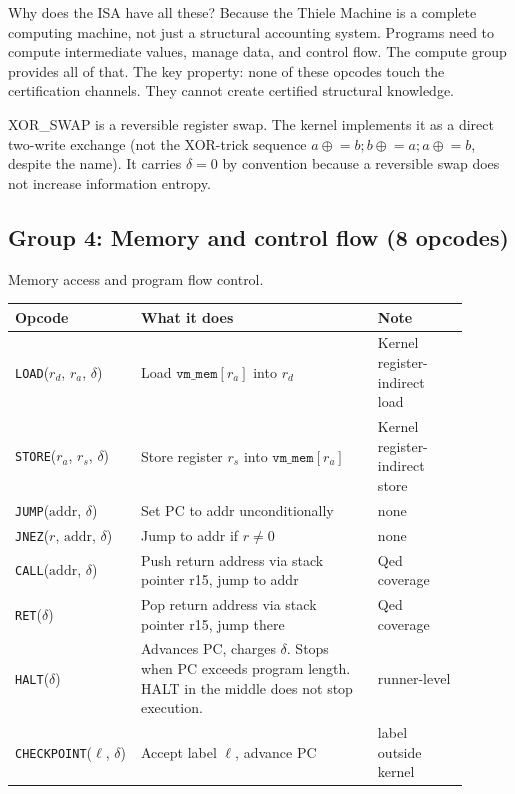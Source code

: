 \documentclass[11pt,a4paper]{article}
\theoremstyle{plain}
\theoremstyle{definition}
\theoremstyle{remark}
\begin{document}
Why does the ISA have all these? Because the Thiele Machine is a complete computing machine, not just a structural accounting system. Programs need to compute intermediate values, manage data, and control flow. The compute group provides all of that. The key property: none of these opcodes touch the certification channels. They cannot create certified structural knowledge.

XOR\_SWAP is a reversible register swap. The kernel implements it as a direct two-write exchange (not the XOR-trick sequence $a \mathrel{\oplus}= b; b \mathrel{\oplus}= a; a \mathrel{\oplus}= b$, despite the name). It carries $\delta = 0$ by convention because a reversible swap does not increase information entropy.

\subsection{Group 4: Memory and control flow (8 opcodes)}

Memory access and program flow control.

\begin{center}
\begin{tabular}{@{}p{0.25\linewidth}p{0.47\linewidth}p{0.18\linewidth}@{}}
\toprule
Opcode & What it does & Note \\
\midrule
\texttt{LOAD}($r_d$, $r_a$, $\delta$) & Load $\texttt{vm\_mem}[r_a]$ into $r_d$ & Kernel register-indirect load \\
\texttt{STORE}($r_a$, $r_s$, $\delta$) & Store register $r_s$ into $\texttt{vm\_mem}[r_a]$ & Kernel register-indirect store \\
\texttt{JUMP}($\text{addr}$, $\delta$) & Set PC to addr unconditionally & none \\
\texttt{JNEZ}($r$, $\text{addr}$, $\delta$) & Jump to addr if $r \neq 0$ & none \\
\texttt{CALL}($\text{addr}$, $\delta$) & Push return address via stack pointer r15, jump to addr & Qed coverage \\
\texttt{RET}($\delta$) & Pop return address via stack pointer r15, jump there & Qed coverage \\
\texttt{HALT}($\delta$) & Advances PC, charges $\delta$. Stops when PC exceeds program length. HALT in the middle does not stop execution. & runner-level \\
\texttt{CHECKPOINT}($\ell$, $\delta$) & Accept label $\ell$, advance PC & label outside kernel \\
\bottomrule
\end{tabular}
\end{center}
\end{document}
